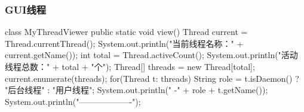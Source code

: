 \begin{frame}[fragile] %
\frametitle{GUI线程}

\begin{javaCode}
class MyThreadViewer {
  public static void view() {
    Thread current = Thread.currentThread();
    System.out.println("当前线程名称：" + current.getName());
    int total = Thread.activeCount();
    System.out.println("活动线程总数：" + total + "个");
    Thread[] threads = new Thread[total];
    current.enumerate(threads);
    for(Thread t: threads) {
      String role = t.isDaemon() ? "后台线程" : "用户线程";
      System.out.println("   -" + role + t.getName());
    }
    System.out.println("-------------------");
  }
}
\end{javaCode}
\end{frame}


